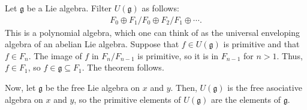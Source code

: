 \documentclass [11 pt, twoside] {article}
\begin{document}
Let $\mathfrak{g}$ be a Lie algebra. Filter $U(\mathfrak{g})$ as follows:
\begin{align*}
	F_0\oplus F_1/F_0 \oplus F_2/F_1\oplus\cdots.
\end{align*}
This is a polynomial algebra, which one can think of as the universal enveloping algebra of an abelian Lie algebra.
Suppose that $f\in U(\mathfrak{g})$ is primitive and that $f\in F_{n}$.
The image of $f$ in $F_{n}/F_{n-1}$ is primitive, so it is in $F_{n-1}$ for $n>1$.
Thus, $f\in F_1$, so $f\in \mathfrak{g}\subseteq F_1$.
The theorem follows.

Now, let $\mathfrak{g}$ be the free Lie algebra on $x$ and $y$. Then, $U(\mathfrak{g})$ is the free asociative algebra on $x$ and $y$, so the primitive elements of $U(\mathfrak{g})$ are the elements of $\mathfrak{g}$.

\printindex
\end{document}
